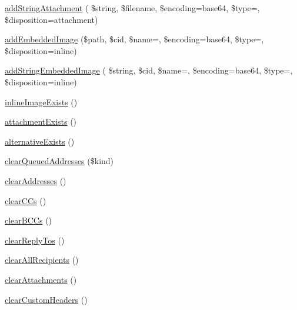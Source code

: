 \begin{DoxyCompactItemize}
\mbox{\hyperlink{class_p_h_p_mailer_a0edd7bb6bf61a7774ccb9390beaed059}{add\+String\+Attachment}} ( \$string, \$filename, \$encoding=\textquotesingle{}base64\textquotesingle{}, \$type=\textquotesingle{}\textquotesingle{}, \$disposition=\textquotesingle{}attachment\textquotesingle{})
\item 
\mbox{\hyperlink{class_p_h_p_mailer_a96495b70b7777ca87fb441458307bb47}{add\+Embedded\+Image}} (\$path, \$cid, \$name=\textquotesingle{}\textquotesingle{}, \$encoding=\textquotesingle{}base64\textquotesingle{}, \$type=\textquotesingle{}\textquotesingle{}, \$disposition=\textquotesingle{}inline\textquotesingle{})
\item 
\mbox{\hyperlink{class_p_h_p_mailer_a749f8bcce46fac00436124f7bdbd4c92}{add\+String\+Embedded\+Image}} ( \$string, \$cid, \$name=\textquotesingle{}\textquotesingle{}, \$encoding=\textquotesingle{}base64\textquotesingle{}, \$type=\textquotesingle{}\textquotesingle{}, \$disposition=\textquotesingle{}inline\textquotesingle{})
\item 
\mbox{\hyperlink{class_p_h_p_mailer_a32ad954f8292a4615a04f41b935db841}{inline\+Image\+Exists}} ()
\item 
\mbox{\hyperlink{class_p_h_p_mailer_a31d3dabce21fc9fc73884a8d0a5dda18}{attachment\+Exists}} ()
\item 
\mbox{\hyperlink{class_p_h_p_mailer_a1ba0cacb520c9783a37d21d4a5d306db}{alternative\+Exists}} ()
\item 
\mbox{\hyperlink{class_p_h_p_mailer_a3bcade00083c362409865a2c1125cb7e}{clear\+Queued\+Addresses}} (\$kind)
\item 
\mbox{\hyperlink{class_p_h_p_mailer_aee6adb214d282869949246c5df46cdb5}{clear\+Addresses}} ()
\item 
\mbox{\hyperlink{class_p_h_p_mailer_a6aadfef524b1d68dbd74c92edeb20e3b}{clear\+C\+Cs}} ()
\item 
\mbox{\hyperlink{class_p_h_p_mailer_aa21c721f20350fd24785b0e757974044}{clear\+B\+C\+Cs}} ()
\item 
\mbox{\hyperlink{class_p_h_p_mailer_a7708faed307f7ab6754cf0fc3e70abd0}{clear\+Reply\+Tos}} ()
\item 
\mbox{\hyperlink{class_p_h_p_mailer_a9e50d689e115e948c49d38d5dc154db6}{clear\+All\+Recipients}} ()
\item 
\mbox{\hyperlink{class_p_h_p_mailer_a4e56a18ac260e14293214c8aaad64e0b}{clear\+Attachments}} ()
\item 
\mbox{\hyperlink{class_p_h_p_mailer_a3cafb993a1f3ea98d157de510cdb7751}{clear\+Custom\+Headers}} ()
\item 

\end{DoxyCompactItemize}
